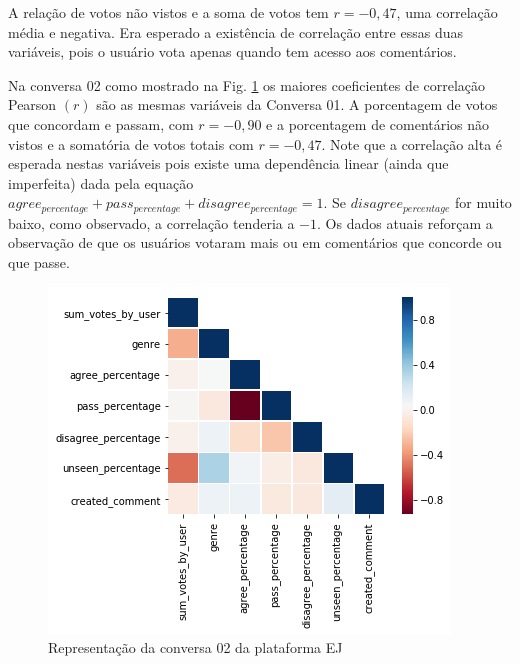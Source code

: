 A relação de votos não vistos e a soma de votos tem $r=-0,47$, uma correlação média e negativa. Era esperado a existência de correlação entre essas duas variáveis, pois o usuário vota apenas quando tem acesso aos comentários.


Na conversa 02 como mostrado na Fig. \ref{fig:corr-por-usuarios-2} os maiores coeficientes de correlação Pearson $(r)$ são as mesmas variáveis da Conversa 01. A porcentagem de votos que concordam e passam, com $r=-0,90$ e a porcentagem de comentários não vistos e a somatória de votos totais com $r=-0,47$. Note que a correlação alta é esperada nestas variáveis pois existe uma dependência linear (ainda que imperfeita) dada pela equação $agree_{percentage} + pass_{percentage} + disagree_{percentage} = 1$. Se $disagree_{percentage}$ for muito baixo, como observado, a correlação tenderia a $-1$. Os dados atuais reforçam a observação de que os usuários votaram mais ou em comentários que concorde ou que passe.


\begin{figure}[!h]
	\centering
	\includegraphics[keepaspectratio=true,scale=0.8]{figuras/tcc2/corr_por_usuarios_2.png}
	\caption{Representação da conversa 02 da plataforma EJ}
	\label{fig:corr-por-usuarios-2}
\end{figure}


